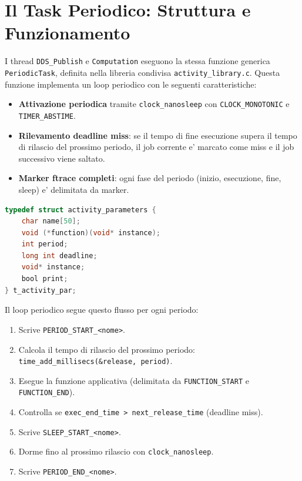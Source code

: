 \section{Il Task Periodico: Struttura e Funzionamento}
\label{sec:periodic_task}

I thread \texttt{DDS\_Publish} e \texttt{Computation} eseguono la stessa
funzione generica \texttt{PeriodicTask}, definita nella libreria condivisa
\texttt{activity\_library.c}. Questa funzione implementa un loop periodico
con le seguenti caratteristiche:

\begin{itemize}
    \item \textbf{Attivazione periodica} tramite \texttt{clock\_nanosleep}
          con \texttt{CLOCK\_MONOTONIC} e \texttt{TIMER\_ABSTIME}.
    \item \textbf{Rilevamento deadline miss}: se il tempo di fine esecuzione
          supera il tempo di rilascio del prossimo periodo, il job corrente
          e' marcato come miss e il job successivo viene saltato.
    \item \textbf{Marker ftrace completi}: ogni fase del periodo
          (inizio, esecuzione, fine, sleep) e' delimitata da marker.
\end{itemize}

\begin{lstlisting}[language=C, caption={Struttura dati per i parametri di attivita'.}, label={lst:activity_par}]
typedef struct activity_parameters {
    char name[50];
    void (*function)(void* instance);
    int period;
    long int deadline;
    void* instance;
    bool print;
} t_activity_par;
\end{lstlisting}

Il loop periodico segue questo flusso per ogni periodo:

\begin{enumerate}
    \item Scrive \texttt{PERIOD\_START\_<nome>}.
    \item Calcola il tempo di rilascio del prossimo periodo:
          \texttt{time\_add\_millisecs(\&release, period)}.
    \item Esegue la funzione applicativa (delimitata da
          \texttt{FUNCTION\_START} e \texttt{FUNCTION\_END}).
    \item Controlla se \texttt{exec\_end\_time > next\_release\_time}
          (deadline miss).
    \item Scrive \texttt{SLEEP\_START\_<nome>}.
    \item Dorme fino al prossimo rilascio con \texttt{clock\_nanosleep}.
    \item Scrive \texttt{PERIOD\_END\_<nome>}.
\end{enumerate}


